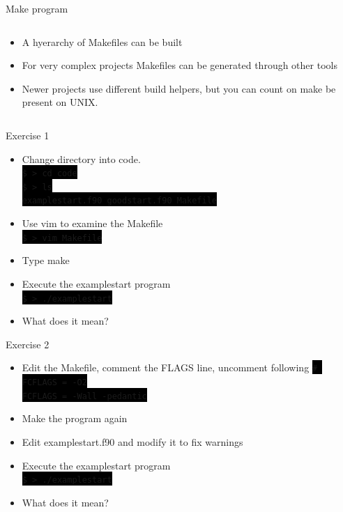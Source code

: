 \documentclass[unknownkeysallowed, 10pt, a4 paper, handout]{beamer}
\newcommand{\code}[1]{\colorbox{black}{\color{green}\texttt{#1}}}
\begin{document}
\begin{frame}[label=makefile]{Make program}
\begin{columns}[T]
\begin{column}{.76\textwidth}
\begin{itemize}
\begin{itemize}
\begin{itemize}
          \end{itemize}
          \item A hyerarchy of Makefiles can be built
          \item For very complex projects Makefiles can be generated through
             other tools
          \item Newer projects use different build helpers, but you can count
             on make be present on UNIX.
        \end{itemize}
      \end{itemize}
    \end{column}
  \end{columns}
\end{frame}


\begin{frame}[label=exercise1]{Exercise 1}
  \begin{itemize}
    \item Change directory into code. \\
       \code{\$ > cd code} \\
       \code{\$ > ls} \\
       \code{examplestart.f90  goodstart.f90  Makefile}
    \item Use vim to examine the Makefile \\
       \code{\$ > vim Makefile}
    \item Type make
    \item Execute the examplestart program \\
       \code{\$ > ./examplestart}
    \item What does it mean?
  \end{itemize}
\end{frame}


\begin{frame}[label=exercise2]{Exercise 2}
  \begin{itemize}
    \item Edit the Makefile, comment the FLAGS line, uncomment following
       \code{\# FCFLAGS = -O2} \\
       \code{FCFLAGS = -Wall -pedantic}
    \item Make the program again
    \item Edit examplestart.f90 and modify it to fix warnings
    \item Execute the examplestart program \\
       \code{\$ > ./examplestart}
    \item What does it mean?
  \end{itemize}
\end{frame}
\end{document}
